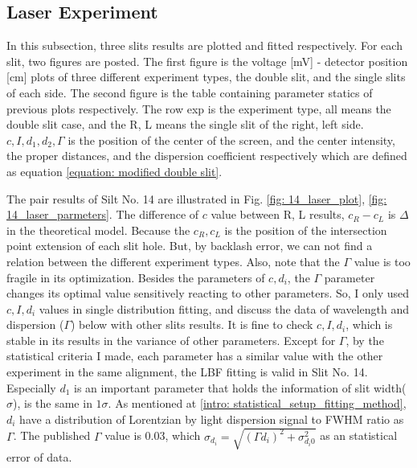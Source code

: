 \documentclass{article}
\begin{document}
\subsection{Laser Experiment}
In this subsection, three slits results are plotted and fitted respectively.
For each slit, two figures are posted.
The first figure is the voltage [mV] - detector position [cm] plots of three different experiment types, the double slit, and the single slits of each side. 
The second figure is the table containing parameter statics of previous plots respectively.
The row exp is the experiment type, all means the double slit case, and the R, L means the single slit of the right, left side.
$c, I,d_1,d_2,\Gamma$ is the position of the center of the screen, and the center intensity, the proper distances, and the dispersion coefficient respectively which are defined as equation \ref{equation: modified double slit}.

The pair results of Silt No. 14 are illustrated in Fig. \ref{fig: 14_laser_plot}, \ref{fig: 14_laser_parmeters}.
The difference of $c$ value between R, L results, $c_R - c_L$ is $\Delta$ in the theoretical model.
Because the $c_R, c_L$ is the position of the intersection point extension of each slit hole.
But, by backlash error, we can not find a relation between the different experiment types.
Also, note that the $\Gamma$ value is too fragile in its optimization.
Besides the parameters of $c, d_i$, the $\Gamma$ parameter changes its optimal value sensitively reacting to other parameters.
So, I only used $c, I,d_i$ values in single distribution fitting, and discuss the data of wavelength and dispersion ($\Gamma$) below with other slits results.
It is fine to check $c, I,d_i$, which is stable in its results in the variance of other parameters.
Except for $\Gamma$, by the statistical criteria I made, each parameter has a similar value with the other experiment in the same alignment, the LBF fitting is valid in Slit No. 14.
Especially $d_1$ is an important parameter that holds the information of slit width($\sigma$), is the same in $1\sigma$.
As mentioned at \ref{intro: statistical_setup_fitting_method}, $d_i$ have a distribution of Lorentzian by light dispersion signal to FWHM ratio as $\Gamma$.
The published $\Gamma$ value is 0.03, which $\sigma_{d_i} = \sqrt{(\Gamma d_i)^2 + \sigma_{d_i0}^2}$ as an statistical error of data.
\end{document}
